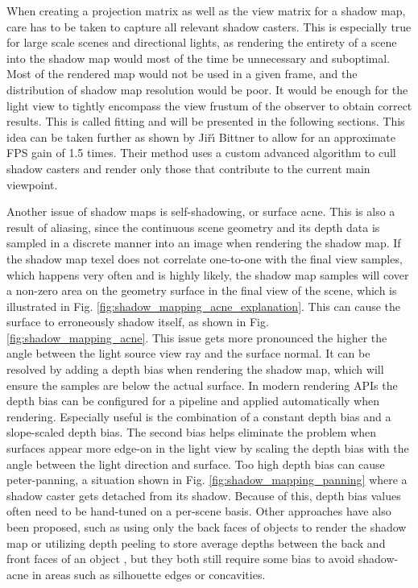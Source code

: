 When creating a projection matrix as well as the view matrix for a shadow map, care has to be taken to capture all relevant shadow casters. This is especially true for large scale scenes and directional lights, as rendering the entirety of a scene into the shadow map would most of the time be unnecessary and suboptimal. Most of the rendered map would not be used in a given frame, and the distribution of shadow map resolution would be poor. It would be enough for the light view to tightly encompass the view frustum of the observer to obtain correct results. This is called fitting and will be presented in the following sections. This idea can be taken further as shown by Ji\v{r}\'{\i} Bittner \cite{bib:proc:bittner_caster_culling} to allow for an approximate FPS gain of 1.5 times. Their method uses a custom advanced algorithm to cull shadow casters and render only those that contribute to the current main viewpoint.

Another issue of shadow maps is self-shadowing, or surface acne. This is also a result of aliasing, since the continuous scene geometry and its depth data is sampled in a discrete manner into an image when rendering the shadow map. If the shadow map texel does not correlate one-to-one with the final view samples, which happens very often and is highly likely, the shadow map samples will cover a non-zero area on the geometry surface in the final view of the scene, which is illustrated in Fig. \ref{fig:shadow_mapping_acne_explanation}. This can cause the surface to erroneously shadow itself, as shown in Fig. \ref{fig:shadow_mapping_acne}. This issue gets more pronounced the higher the angle between the light source view ray and the surface normal. It can be resolved by adding a depth bias when rendering the shadow map, which will ensure the samples are below the actual surface. In modern rendering APIs the depth bias can be configured for a pipeline and applied automatically when rendering. Especially useful is the combination of a constant depth bias and a slope-scaled depth bias. The second bias helps eliminate the problem when surfaces appear more edge-on in the light view by scaling the depth bias with the angle between the light direction and surface. Too high depth bias can cause peter-panning, a situation shown in Fig. \ref{fig:shadow_mapping_panning} where a shadow caster gets detached from its shadow. Because of this, depth bias values often need to be hand-tuned on a per-scene basis. Other approaches have also been proposed, such as using only the back faces of objects to render the shadow map \cite{bib:rep:wang_second_depth_mapping} or utilizing depth peeling to store average depths between the back and front faces of an object \cite{bib:book:woo_midpoint_depth_map}, but they both still require some bias to avoid shadow-acne in areas such as silhouette edges or concavities.

